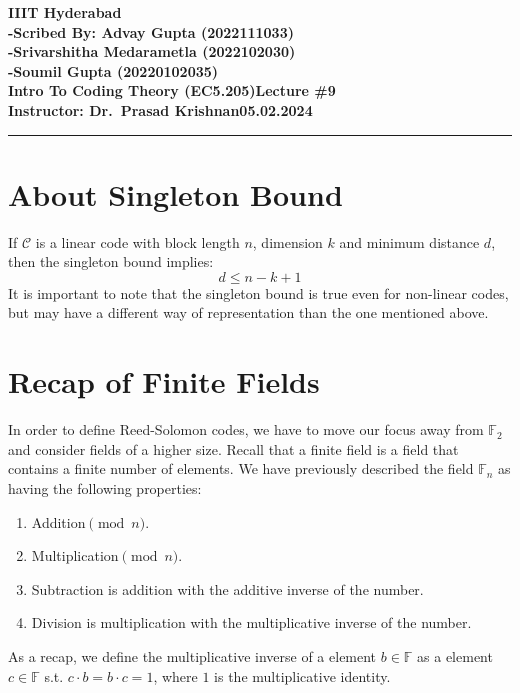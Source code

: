 \documentclass[11pt]{article}
\theoremstyle{definition}
\theoremstyle{plain}
\newcommand{\assignment}{Lecture \#9}
\newcommand{\duedate}{05.02.2024}
\begin{document}
\textbf{IIIT Hyderabad}\hfill\\[0.01in]
\textbf{-}\hfill\textbf{Scribed By: Advay Gupta (2022111033)}\\[0.01in]
\textbf{-}\hfill\textbf{Srivarshitha Medarametla (2022102030)}\\[0.01in]
\textbf{-}\hfill\textbf{Soumil Gupta (20220102035)}\\[0.01in]
\textbf{Intro To Coding Theory (EC5.205)}\hfill\textbf{\assignment}\\[0.01in]
\textbf{Instructor: Dr.\ Prasad Krishnan}\hfill\textbf{\duedate}\\
\smallskip\hrule\bigskip



\section{About Singleton Bound}
If $\mathcal{C}$ is a linear code with block length $n$, dimension $k$ and minimum distance $d$, then the singleton bound implies:
$$d \leq n-k+1$$
It is important to note that the singleton bound is true even for non-linear codes, but may have a different way of representation than the one mentioned above. 

\section{Recap of Finite Fields}

In order to define Reed-Solomon codes, we have to move our focus away from $\mathbb{F}_{2}$ and consider fields of a higher size. Recall that a finite field is a field that contains a finite number of elements. We have previously described the field $\mathbb{F}_{n}$ as having the following properties:

\begin{enumerate}
  \item Addition$\pmod{n}$.
  \item Multiplication$\pmod{n}$.
  \item Subtraction is addition with the additive inverse of the number.
  \item Division is multiplication with the multiplicative inverse of the number.
\end{enumerate}

As a recap, we define the multiplicative inverse of a element $b \in \mathbb{F}$ as a element $c \in \mathbb{F}$ s.t. $c \cdot b = b \cdot c = 1$, where $1$ is the multiplicative identity. \\
\end{document}
